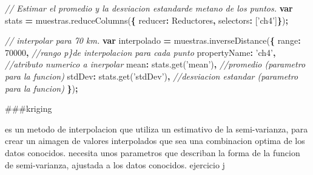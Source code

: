 \documentclass[
]{article}
\newenvironment{Shaded}{\begin{snugshade}}{\end{snugshade}}
\newcommand{\AttributeTok}[1]{\textcolor[rgb]{0.77,0.63,0.00}{#1}}
\newcommand{\CommentTok}[1]{\textcolor[rgb]{0.56,0.35,0.01}{\textit{#1}}}
\newcommand{\DataTypeTok}[1]{\textcolor[rgb]{0.13,0.29,0.53}{#1}}
\newcommand{\DecValTok}[1]{\textcolor[rgb]{0.00,0.00,0.81}{#1}}
\newcommand{\KeywordTok}[1]{\textcolor[rgb]{0.13,0.29,0.53}{\textbf{#1}}}
\newcommand{\NormalTok}[1]{#1}
\newcommand{\OperatorTok}[1]{\textcolor[rgb]{0.81,0.36,0.00}{\textbf{#1}}}
\newcommand{\StringTok}[1]{\textcolor[rgb]{0.31,0.60,0.02}{#1}}
\newcommand{\VariableTok}[1]{\textcolor[rgb]{0.00,0.00,0.00}{#1}}
\begin{document}
\begin{Shaded}
\begin{Highlighting}[]
\CommentTok{// Estimar el promedio y la desviacion estandarde metano de los puntos.}
\KeywordTok{var}\NormalTok{ stats }\OperatorTok{=} \VariableTok{muestras}\NormalTok{.}\AttributeTok{reduceColumns}\NormalTok{(}\OperatorTok{\{}
  \DataTypeTok{reducer}\OperatorTok{:}\NormalTok{ Reductores}\OperatorTok{,}
  \DataTypeTok{selectors}\OperatorTok{:}\NormalTok{ [}\StringTok{'ch4'}\NormalTok{]}\OperatorTok{\}}\NormalTok{)}\OperatorTok{;}

\CommentTok{// interpolar para 70 km.}
\KeywordTok{var}\NormalTok{ interpolado }\OperatorTok{=} \VariableTok{muestras}\NormalTok{.}\AttributeTok{inverseDistance}\NormalTok{(}\OperatorTok{\{}
  \DataTypeTok{range}\OperatorTok{:} \DecValTok{70000}\OperatorTok{,} \CommentTok{//rango p\}de interpolacion para cada punto}
  \DataTypeTok{propertyName}\OperatorTok{:} \StringTok{'ch4'}\OperatorTok{,} \CommentTok{//atributo numerico a inerpolar}
  \DataTypeTok{mean}\OperatorTok{:} \VariableTok{stats}\NormalTok{.}\AttributeTok{get}\NormalTok{(}\StringTok{'mean'}\NormalTok{)}\OperatorTok{,} \CommentTok{//promedio (parametro para la funcion)}
  \DataTypeTok{stdDev}\OperatorTok{:} \VariableTok{stats}\NormalTok{.}\AttributeTok{get}\NormalTok{(}\StringTok{'stdDev'}\NormalTok{)}\OperatorTok{,} \CommentTok{//desviacion estandar (parametro para la funcion)}
  \OperatorTok{\}}\NormalTok{)}\OperatorTok{;} 
\end{Highlighting}
\end{Shaded}

\#\#\#kriging

es un metodo de interpolacion que utiliza un estimativo de la
semi-varianza, para crear un aimagen de valores interpolados que sea una
combinacion optima de los datos conocidos. necesita unos parametros que
describan la forma de la funcion de semi-varianza, ajustada a los datos
conocidos. ejercicio j
\end{document}
